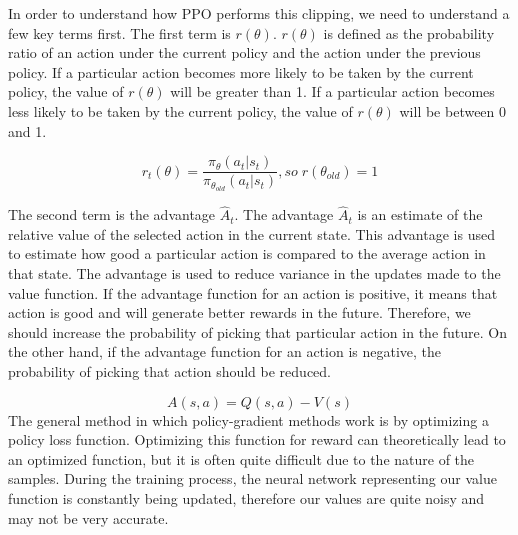 In order to understand how PPO performs this clipping, we need to understand a few key terms first. The first term is $r(\theta)$. $r(\theta)$ is defined as the probability ratio of an action under the current policy and the action under the previous policy. If a particular action becomes more likely to be taken by the current policy, the value of $r(\theta)$ will be greater than 1. If a particular action becomes less likely to be taken by the current policy, the value of $r(\theta)$ will be between 0 and 1.



\begin{equation}
    r_{t}(\theta) = \frac{\pi_{\theta}(a_{t}|s_{t})}{\pi_{\theta}_{old}(a_{t}|s_{t})}, so\; r(\theta_{old}) = 1
\end{equation}


The second term is the advantage $\hat{A}_{t}$. The advantage $\hat{A}_{t}$ is an estimate of the relative value of the selected action in the current state. This advantage is used to estimate how good a particular action is compared to the average action in that state. The advantage is used to reduce variance in the updates made to the value function. If the advantage function for an action is positive, it means that action is good and will generate better rewards in the future. Therefore, we should increase the probability of picking that particular action in the future. On the other hand, if the advantage function for an action is negative, the probability of picking that action should be reduced.

\begin{equation}
    A(s,a) = Q(s,a) - V(s)
\end{equation}
The general method in which policy-gradient methods work is by optimizing a policy loss function. Optimizing this function for reward can theoretically lead to an optimized function, but it is often quite difficult due to the nature of the samples. During the training process, the neural network representing our value function is constantly being updated, therefore our values are quite noisy and may not be very accurate.

